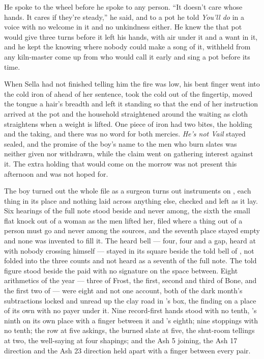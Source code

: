 He spoke to the wheel before he spoke to any person. “It doesn't care whose hands. It cares if they're steady,” he said, and to a pot he told \emph{You'll do} in a voice with no welcome in it and no unkindness either. He knew the  that pot would give three turns before it left his hands, with air under it and a want in it, and he kept the knowing where nobody could make a song of it, withheld from any kiln-master come up from  who would call it early and sing a pot before its time.

When Sella had not finished telling him the fire was low, his bent finger went into the cold iron of  ahead of her sentence, took the cold out of the fingertip, moved the tongue a hair's breadth and left it standing so that the end of her instruction arrived at the pot and the household straightened around the waiting as cloth straightens when a weight is lifted. One piece of iron had two bites, the holding and the taking, and there was no  word for both mercies. \emph{He's not Vail} stayed sealed, and the promise of the boy's name to the men who burn slates was neither given nor withdrawn, while the claim went on gathering interest against it. The extra holding that would come on the morrow was not present this afternoon and was not hoped for.

\scenebreak

The boy turned out the whole file as a surgeon turns out instruments on , each thing in its place and nothing laid across anything else, checked and left as it lay. Six hearings of the full note stood beside and never among, the sixth the small flat knock out of a woman as the men lifted her, filed where a thing out of a person must go and never among the sources, and the seventh place stayed empty and none was invented to fill it. The heard bell --- four, four and a gap, heard at  with nobody crossing himself --- stayed in its square beside the told bell of , not folded into the three counts and not heard as a seventh of the full note. The told figure stood beside the paid with no signature on the space between. Eight arithmetics of the year --- three of Frost, the first, second and third of Bone, and the first two of  --- were eight and not one account, both of the dark month's subtractions locked and unread up the clay road in 's box, the finding on a place of its own with no payer under it. Nine record-first hands stood with no tenth, 's ninth on its own place with a finger between it and 's eighth; nine stoppings with no tenth; the row at five askings, the burned slate at five, the shut-room tellings at two, the well-saying at four shapings; and the Ash 5 joining, the Ash 17 direction and the Ash 23 direction held apart with a finger between every pair.

